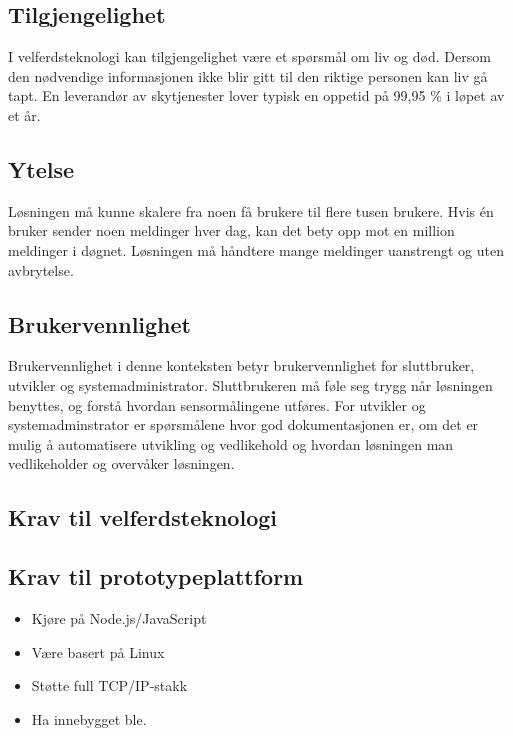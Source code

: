 \subsection{Tilgjengelighet}
I velferdsteknologi kan tilgjengelighet være et spørsmål om liv og død. Dersom den nødvendige informasjonen ikke blir gitt til den
riktige personen kan liv gå tapt. En leverandør av skytjenester lover typisk en oppetid på 99,95 \% i løpet av et år.

\subsection{Ytelse}
Løsningen må kunne skalere fra noen få brukere til flere tusen brukere. Hvis én bruker sender noen meldinger hver dag, kan det
bety opp mot en million meldinger i døgnet. Løsningen må håndtere mange meldinger uanstrengt og uten avbrytelse.

\subsection{Brukervennlighet}
Brukervennlighet i denne konteksten betyr brukervennlighet for sluttbruker, utvikler og systemadministrator.
Sluttbrukeren må føle seg trygg når løsningen benyttes, og forstå hvordan sensormålingene utføres.
For utvikler og systemadminstrator er spørsmålene hvor god dokumentasjonen er, om det er mulig å automatisere
utvikling og vedlikehold og hvordan løsningen man vedlikeholder og overvåker løsningen.

\subsection{Krav til velferdsteknologi}
\subsection{Krav til prototypeplattform}

\begin{itemize}
    \item Kjøre på Node.js/JavaScript
    \item Være basert på Linux
    \item Støtte full TCP/IP-stakk
    \item Ha innebygget \gls{ble}.
\end{itemize}



